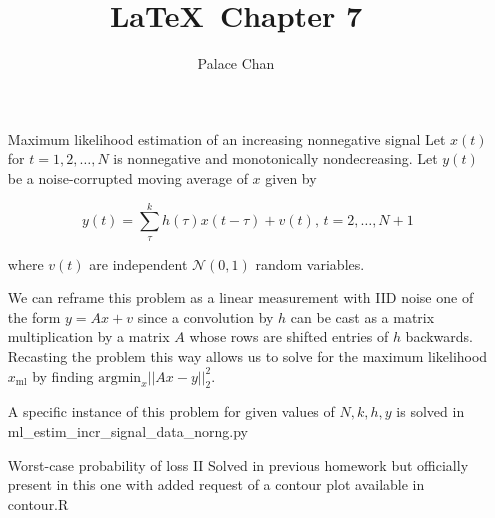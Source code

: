 \documentclass[12pt]{article}
\title{\LaTeX\ Chapter 7}
\author{Palace Chan}
\begin{document}
\maketitle
\newpage

\begin{itemize}

\item[Maximum likelihood estimation of an increasing nonnegative signal]
  Let $x(t)$ for $t = 1,2,\ldots,N$ is nonnegative and monotonically nondecreasing. Let $y(t)$ be a noise-corrupted moving average of $x$ given by

  $$y(t) = \sum_\tau^k h(\tau) x(t - \tau) + v(t) \text{, } t = 2,\ldots,N+1$$

  where $v(t)$ are independent $\mathcal{N}(0,1)$ random variables.

  We can reframe this problem as a linear measurement with IID noise one of the form $y = A x + v$ since a convolution by $h$ can be cast as a matrix multiplication by a matrix $A$ whose rows are shifted entries of $h$ backwards. Recasting the problem this way allows us to solve for the maximum likelihood $x_\text{ml}$ by finding $\text{argmin}_x || Ax - y ||_2^2$.

  A specific instance of this problem for given values of $N, k, h, y$ is solved in ml_estim_incr_signal_data_norng.py

\item[Worst-case probability of loss II]
  Solved in previous homework but officially present in this one with added request of a contour plot available in contour.R
\end{itemize}
\end{document}
